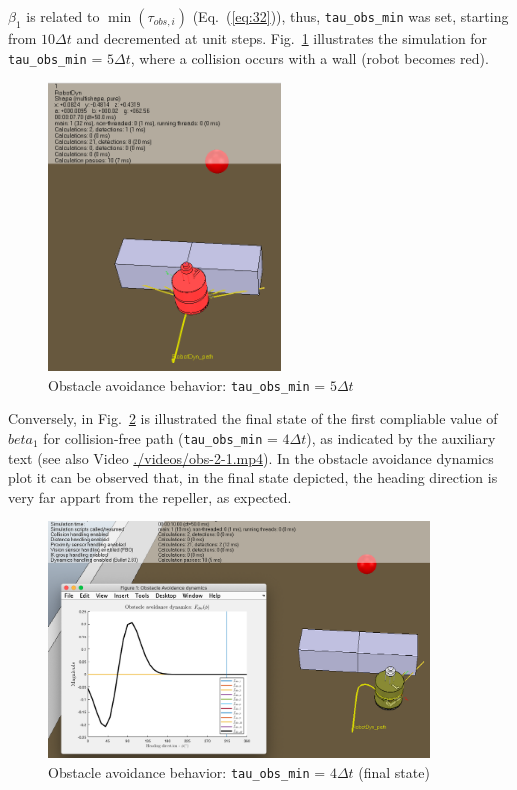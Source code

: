 $\beta_1$ is related to $\min(\tau_{obs,i})$ (Eq.~(\ref{eq:32})), thus,
\texttt{tau\_obs\_min} was set, starting from $10 \Delta t$ and
decremented at unit steps. Fig.~\ref{fig:obs-2-1-arena-fail} illustrates the
simulation for \texttt{tau\_obs\_min} = $5 \Delta t$, where a collision occurs
with a wall (robot becomes red). 
%
\begin{figure}[!hbt]
\centering
    \includegraphics[width=0.55\textwidth]{./img/obs-2-1-arena-fail.png}
  \caption{Obstacle avoidance behavior: \texttt{tau\_obs\_min} = $5 \Delta t$}%
\label{fig:obs-2-1-arena-fail}
\end{figure}

Conversely, in
Fig.~\ref{fig:obs-2-1-arena-success} is illustrated the final state of the first
compliable value of $beta_1$ for collision-free path (\texttt{tau\_obs\_min} =
$4 \Delta t$), as indicated by the auxiliary text 
(see also Video \href{run:./videos/obs-2-1.mp4}{./videos/obs-2-1.mp4}). 
In the obstacle avoidance
dynamics plot it can be observed that, in the final state depicted, the heading
direction is very far appart from the repeller, as expected. 
%
\begin{figure}[!hbt]
\centering
    \includegraphics[width=0.9\textwidth]{./img/obs-2-1-arena-success.png}
  \caption{Obstacle avoidance behavior: \texttt{tau\_obs\_min} = $4 \Delta t$ (final state)}%
\label{fig:obs-2-1-arena-success}
\end{figure}

